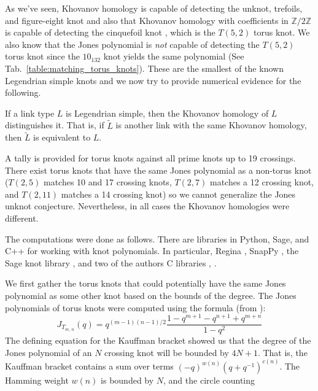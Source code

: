 As we've seen, Khovanov homology is capable of detecting the
unknot, trefoils, and figure-eight knot and also that Khovanov homology with
coefficients in $\mathbb{Z}/2\mathbb{Z}$ is capable of detecting
the cinquefoil knot \cite{BaldwinYingSivekCinquefoilKhovanov},
which is the $T(5,2)$ torus knot. We also know that the Jones
polynomial is \textit{not} capable of detecting the
$T(5,2)$ torus knot since the $10_{132}$ knot yields the same
polynomial (See Tab.~\ref{table:matching_torus_knots}).
These are the smallest of the known Legendrian simple knots
and we now try to provide numerical evidence for the following.
\begin{conjecture}
    If a link type $L$ is Legendrian simple, then the Khovanov homology
    of $L$ distinguishes it. That is, if $\tilde{L}$
    is another link with the same Khovanov homology, then $\tilde{L}$ is
    equivalent to $L$.
\end{conjecture}
A tally is provided for torus knots against all prime knots up to 19 crossings.
There exist torus knots that have the same Jones polynomial as a non-torus
knot ($T(2,5)$ matches 10 and 17 crossing knots, $T(2,7)$
matches a 12 crossing knot, and $T(2,11)$ matches a 14 crossing knot)
so we cannot generalize the Jones unknot conjecture. Nevertheless, in
all cases the Khovanov homologies were different.
\par\hfill\par
The computations were done as follows. There are libraries in Python,
Sage, and C++ for working with knot polynomials. In particular,
Regina \cite{regina}, SnapPy \cite{SnapPy}, the Sage knot library
\cite{sage}, and two of the authors C libraries
\cite{MaguireJones}, \cite{MaguireLibtmpl}.
\par\hfill\par
We first gather the torus knots that could potentially have the same
Jones polynomial as some other knot based on the bounds of the degree.
The Jones polynomials of torus knots were computed using the
formula (from \cite{JonesJonesPolyForDummies}):
\begin{equation}
    \label{eqn:jones_poly_torus}%
    J_{T_{m,\,n}}(q)=q^{(m-1)(n-1)/2}
        \frac{1-q^{m+1}-q^{n+1}+q^{m+n}}{1-q^{2}}
\end{equation}
The defining equation for the Kauffman bracket showed us that the degree of the
Jones polynomial of an $N$ crossing knot will be bounded by $4N+1$. That is,
the Kauffman bracket contains a sum over terms $(-q)^{w(n)}(q+q^{-1})^{c(n)}$.
The Hamming weight $w(n)$ is bounded by $N$, and the circle counting
